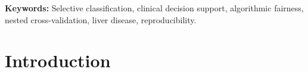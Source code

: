 \documentclass[11pt,a4paper]{article}
\begin{document}
\begin{abstract}
\textbf{Interpretability \& Robustness:} Error profiling revealed that 39.4\% of false negatives occurred in females, who presented with normal median liver enzymes (ALT: 16.0 U/L, Bilirubin: 0.70 mg/dL). Methodological replication on the secondary UCI HCV cohort ($N=615$) confirmed model calibration and discrimination across clinical arms.\\
\textbf{Conclusion:} Finite-sample clinical referral policies can audit and structure worst-case triage trade-offs, but small subgroup sample sizes constrain statistical power, the primary hypothesis was not supported at $B=0.20$, and high-recall screening inherently yields low specificity ($\approx 23\%$) without selective referral.
\end{abstract}

\vspace{1em}
\noindent\textbf{Keywords:} Selective classification, clinical decision support, algorithmic fairness, nested cross-validation, liver disease, reproducibility.

\newpage

\section{Introduction}
\end{document}
